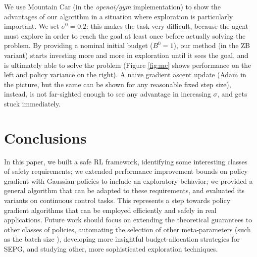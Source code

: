We use Mountain Car (in the \textit{openai/gym} implementation) to show the advantages of our algorithm in a situation where exploration is particularly important. We set $\sigma^0 = 0.2$:
this makes the task very difficult, because the agent must explore in order to reach the goal at least once before actually solving the problem. By providing a nominal initial budget ($B^0 = 1$), our method (in the ZB variant) starts investing more and more in exploration until it sees the goal, and is ultimately able to solve the problem (Figure \ref{fig:mc} shows performance on the left and policy variance on the right). A naive gradient ascent update (Adam in the picture, but the same can be shown for any reasonable fixed step size), instead, is not far-sighted enough to see any advantage in increasing $\sigma$, and gets stuck immediately. 

\section{Conclusions}
In this paper, we built a safe RL framework, identifying some interesting classes of safety requirements; we extended performance improvement bounds on policy gradient with Gaussian policies to include an exploratory behavior; we provided a general algorithm that can be adapted to these requirements, and evaluated its variants on continuous control tasks. This represents a step towards policy gradient algorithms that can be employed efficiently and safely in real applications. Future work should focus on extending the theoretical guarantees to other classes of policies, automating the selection of other meta-parameters (such as the batch size \cite{adaptive_batch}), developing more insightful budget-allocation strategies for SEPG, and studying other, more sophisticated  exploration techniques.
